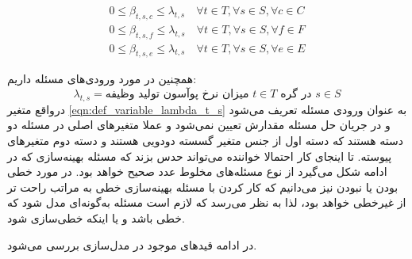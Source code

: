 	\begin{subequations}\label{eqn:def_variable_beta}
		\begin{align}
		0 \le \beta_{t,s,c} \le \lambda_{t,s}  \quad \forall{t \in T}, \forall{s \in S}, \forall{c \in C} \\
		0 \le \beta_{t,s,f} \le \lambda_{t,s}  \quad \forall{t \in T}, \forall{s \in S}, \forall{f \in F} \\
		0 \le \beta_{t,s,e} \le \lambda_{t,s}  \quad \forall{t \in T}, \forall{s \in S}, \forall{e \in E}
		\end{align}
	\end{subequations}
 
		همچنین در مورد ورودی‌های مسئله داریم:
	\begin{equation}\label{eqn:def_variable_lambda_t_s}
	\lambda_{t,s} = \text{میزان نرخ پوآسون تولید وظیفه $t \in T$ در گره $s \in S$}
	\end{equation}
	درواقع متغیر \cref{eqn:def_variable_lambda_t_s} به عنوان ورودی مسئله تعریف می‌شود و در جریان حل مسئله مقدارش تعیین نمی‌شود و عملا متغیرهای اصلی در مسئله دو دسته هستند که دسته اول از جنس متغیر گسسته دودویی هستند و دسته دوم متغیرهای پیوسته. تا اینجای کار احتمالا خواننده می‌تواند حدس بزند که مسئله بهینه‌سازی که در ادامه شکل می‌گیرد از نوع مسئله‌های مخلوط عدد صحیح  خواهد بود. در مورد خطی بودن یا نبودن نیز می‌دانیم که کار کردن با مسئله بهینه‌سازی خطی به مراتب راحت تر از غیرخطی خواهد بود، لذا به نظر می‌رسد که لازم است مسئله به‌گونه‌ای مدل شود که خطی باشد و یا اینکه خطی‌سازی شود. 
	
	در ادامه قیدهای موجود در مدل‌سازی بررسی می‌شود. 
